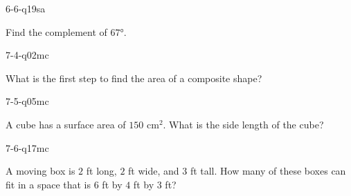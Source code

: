 \begin{practiceQuestion}{6-6-q19}{sa}
\begin{questionText}
Find the complement of $67°$.
\end{questionText}
\end{practiceQuestion}

\begin{practiceQuestion}{7-4-q02}{mc}
\begin{questionText}
What is the first step to find the area of a composite shape?
\end{questionText}
\end{practiceQuestion}

\begin{practiceQuestion}{7-5-q05}{mc}
\begin{questionText}
A cube has a surface area of $150$ cm$^2$. What is the side length of the cube?
\end{questionText}
\end{practiceQuestion}

\begin{practiceQuestion}{7-6-q17}{mc}
\begin{questionText}
A moving box is $2$ ft long, $2$ ft wide, and $3$ ft tall. How many of these boxes can fit in a space that is $6$ ft by $4$ ft by $3$ ft?
\end{questionText}
\end{practiceQuestion}

